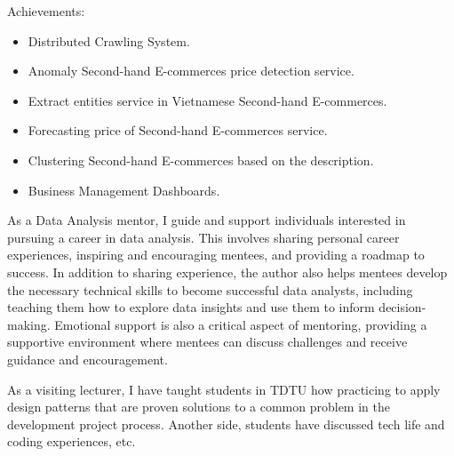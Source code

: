 \documentclass[10pt,a4paper,ragged2e,withhyper]{altacv}
\begin{document}
\begin{paracol}{2}
\begin{minipage}{\linewidth}
 Achievements:
\end{minipage}

\medskip

\begin{itemize}
    \item  Distributed Crawling System.
    \item  Anomaly Second-hand E-commerces price detection service.
    \item  Extract entities service in Vietnamese Second-hand E-commerces.
    \item  Forecasting price of Second-hand E-commerces service.
    \item  Clustering Second-hand E-commerces based on the description.
    \item  Business Management Dashboards.
\end{itemize}
\divider


\begin{minipage}{\linewidth}
\justifying
As a Data Analysis mentor, I guide and support individuals interested in pursuing a career in data analysis. This involves sharing personal career experiences, inspiring and encouraging mentees, and providing a roadmap to success. In addition to sharing experience, the author also helps mentees develop the necessary technical skills to become successful data analysts, including teaching them how to explore data insights and use them to inform decision-making. Emotional support is also a critical aspect of mentoring, providing a supportive environment where mentees can discuss challenges and receive guidance and encouragement.
\end{minipage}

\bigskip

\divider


\begin{minipage}{\linewidth}
\justifying
As a visiting lecturer, I have taught students in TDTU how practicing to apply design patterns that are proven solutions to a common problem in the development project process. Another side, students have discussed tech life and coding experiences, etc.
\end{minipage}


\end{paracol}
\end{document}
